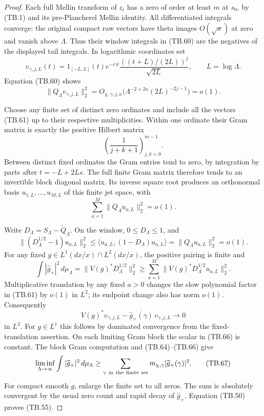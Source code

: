 \begin{proof}
Each full Mellin transform of \(z_i\) has a zero of order
at least \(m\) at \(s_0\), by (TB.1) and its pre-Plancherel
Mellin identity.  All differentiated integrals converge:
the original compact raw vectors have theta images
\(O(\sqrt x)\) at zero and vanish above \(\Lambda\).
Thus their window integrals in (TB.60) are the negatives
of the displayed tail integrals.
In logarithmic coordinates set
\[
 v_{\gamma,j,L}(t)=
    1_{[-L,L]}(t)e^{-i\gamma t}
          \frac{((t+L)/(2L))^j}{\sqrt{2L}},
 \qquad L=\log\Lambda.
 \tag{TB.61}
\]
Equation (TB.60) shows
\[
 \|Q_\Lambda v_{\gamma,j,L}\|_2^2
      =O_{\chi,\gamma,j,\kappa}
           \bigl(\Lambda^{-2+2\kappa}(2L)^{-2j-1}\bigr)=o(1).
 \tag{TB.62}
\]

Choose any finite set of distinct zero ordinates and include
all the vectors (TB.61) up to their respective multiplicities.
Within one ordinate their Gram matrix is exactly the positive
Hilbert matrix
\[
                 \left(\frac1{j+k+1}\right)_{j,k=0}^{m-1}.
\]
Between distinct fixed ordinates the Gram entries tend to
zero, by integration by parts after \(t=-L+2Ls\).
The full finite Gram matrix therefore tends to an invertible
block diagonal matrix.  Its inverse square root produces an
orthonormal basis \(u_{1,L},\ldots,u_{M,L}\) of this finite
jet space, with
\[
                    \sum_{a=1}^M\|Q_\Lambda u_{a,L}\|_2^2=o(1).
 \tag{TB.63}
\]

Write \(D_\Lambda=S_\Lambda-\widetilde Q_\Lambda\).
On the window, \(0\leq D_\Lambda\leq1\), and
\[
 \|(D_\Lambda^{1/2}-1)u_{a,L}\|_2^2
 \leq\langle u_{a,L},(1-D_\Lambda)u_{a,L}\rangle
                    =\|Q_\Lambda u_{a,L}\|_2^2=o(1).
 \tag{TB.64}
\]
For any fixed \(g\in L^1(dx/x)\cap L^2(dx/x)\), the positive
pairing is finite and
\[
 \int|\widehat g_+|^2\,d\mu_\Lambda
       =\|V(g)^*D_\Lambda^{1/2}\|_2^2
       \geq\sum_{a=1}^M
                  \|V(g)^*D_\Lambda^{1/2}u_{a,L}\|_2^2 .
 \tag{TB.65}
\]
Multiplicative translation by any fixed \(a>0\) changes the
slow polynomial factor in (TB.61) by \(o(1)\) in \(L^2\);
its endpoint change also has norm \(o(1)\).
Consequently
\[
 V(g)^*v_{\gamma,j,L}
            -\overline{\widehat g_+(\gamma)}\,v_{\gamma,j,L}
                         \longrightarrow0
 \tag{TB.66}
\]
in \(L^2\).  For \(g\in L^1\) this follows by dominated
convergence from the fixed-translation assertion.
On each limiting Gram block the scalar in (TB.66) is constant.
The block Gram computation and (TB.64)--(TB.66) give
\[
 \liminf_{\Lambda\to\infty}
       \int|\widehat g_+|^2\,d\mu_\Lambda
       \geq\sum_{\gamma\ {\rm in\ the\ finite\ set}}
                         m_{\chi,\gamma}|\widehat g_+(\gamma)|^2.
 \tag{TB.67}
\]
For compact smooth \(g\), enlarge the finite set to all zeros.
The sum is absolutely convergent by the usual zero count
and rapid decay of \(\widehat g_+\).
Equation (TB.50) proves (TB.55).


\end{proof}
